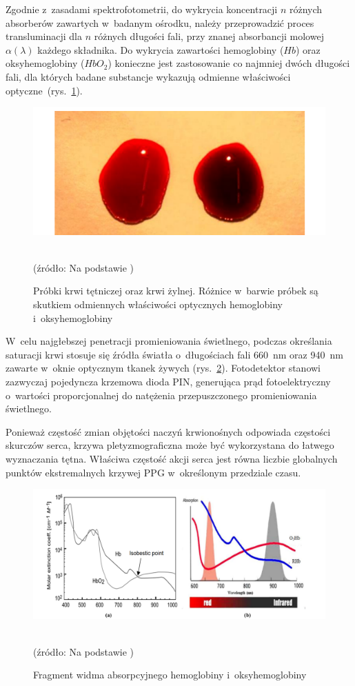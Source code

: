 Zgodnie z~zasadami spektrofotometrii, do wykrycia koncentracji $n$ różnych absorberów zawartych w~badanym ośrodku, należy przeprowadzić proces transluminacji dla $n$ różnych długości fali,
przy znanej absorbancji molowej $\alpha(\lambda)$ każdego składnika. Do wykrycia zawartości hemoglobiny ($Hb$) oraz oksyhemoglobiny ($HbO_{2}$) konieczne jest zastosowanie co najmniej
dwóch długości fali, dla których badane substancje wykazują odmienne właściwości optyczne~(rys.~\ref{rys:blood}).
\begin{figure}[ht]
\centerline{\includegraphics[scale = 0.63]{graphic/blood.png}}
	\caption{Próbki krwi tętniczej oraz krwi żylnej. Różnice w~barwie próbek są skutkiem odmiennych właściwości optycznych hemoglobiny i~oksyhemoglobiny}
	\label{rys:blood}
	~\\
	(źródło: Na podstawie \cite{Dwyer:2008})
\end{figure}

W~celu najgłebszej penetracji promieniowania świetlnego, podczas określania saturacji krwi stosuje się źródła światła o~długościach fali 660~nm oraz 940~nm zawarte w~oknie optycznym tkanek żywych 
(rys.~\ref{rys:RIR}). Fotodetektor stanowi zazwyczaj pojedyncza krzemowa dioda PIN, generująca prąd fotoelektryczny o~wartości proporcjonalnej do natężenia przepuszczonego promieniowania świetlnego. 

Ponieważ częstość zmian objętości naczyń krwionośnych odpowiada częstości skurczów serca, krzywa pletyzmograficzna może być wykorzystana do łatwego wyznaczania tętna. Właściwa częstość 
akcji serca jest równa liczbie globalnych punktów ekstremalnych krzywej PPG w~określonym przedziale czasu.
\begin{figure}[h]
\centerline{\includegraphics[scale = 0.46]{graphic/RIR.png}}
	\caption{Fragment widma absorpcyjnego hemoglobiny i~oksyhemoglobiny}
	\label{rys:RIR}
	~\\
	(źródło: Na podstawie \cite{Dwyer:2008})
\end{figure}

